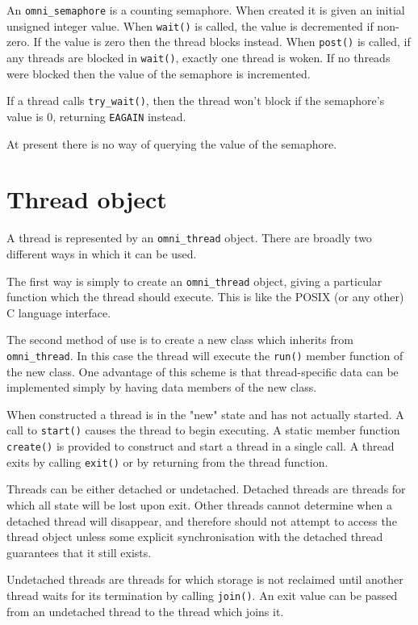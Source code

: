 \documentclass[11pt]{article}
\begin{document}
An {\tt omni\_semaphore} is a counting semaphore.  When created it is given an
initial unsigned integer value.  When {\tt wait()} is called, the value is
decremented if non-zero.  If the value is zero then the thread blocks instead.
When {\tt post()} is called, if any threads are blocked in {\tt wait()},
exactly one thread is woken. If no threads were blocked then the value of the
semaphore is incremented.

If a thread calls {\tt try\_wait()}, then the thread won't block if the
semaphore's value is 0, returning {\tt EAGAIN} instead.

At present there is no way of querying the value of the semaphore.



\section{Thread object}

A thread is represented by an {\tt omni\_thread} object.  There are broadly two
different ways in which it can be used.

The first way is simply to create an {\tt omni\_thread} object, giving a
particular function which the thread should execute.  This is like the POSIX
(or any other) C language interface.

The second method of use is to create a new class which inherits from {\tt
omni\_thread}.  In this case the thread will execute the {\tt run()} member
function of the new class.  One advantage of this scheme is that
thread-specific data can be implemented simply by having data members of the
new class.

When constructed a thread is in the "new" state and has not actually started.
A call to {\tt start()} causes the thread to begin executing.  A static member
function {\tt create()} is provided to construct and start a thread in a single
call.  A thread exits by calling {\tt exit()} or by returning from the thread
function.

Threads can be either detached or undetached.  Detached threads are threads for
which all state will be lost upon exit.  Other threads cannot determine when a
detached thread will disappear, and therefore should not attempt to access the
thread object unless some explicit synchronisation with the detached thread
guarantees that it still exists.

Undetached threads are threads for which storage is not reclaimed until another
thread waits for its termination by calling {\tt join()}.  An exit value can be
passed from an undetached thread to the thread which joins it.
\end{document}

